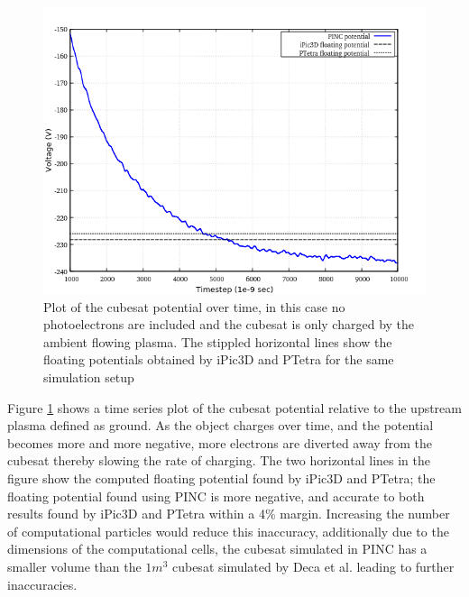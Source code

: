 \begin{figure}[H]
    \centering
    \includegraphics[scale=0.4]{figures/DECA/NoPhotoelectrons/pNoPH.png}
    \caption{Plot of the cubesat potential over time, in this case no photoelectrons are included and the cubesat is only charged by the ambient flowing plasma. The stippled horizontal lines show the floating potentials obtained by iPic3D and PTetra for the same simulation setup}
    \label{fig:pNoPH}
\end{figure}
\raggedbottom
Figure \ref{fig:pNoPH} shows a time series plot of the cubesat potential relative to the upstream plasma defined as ground. As the object charges over time, and the potential becomes more and more negative, more electrons are diverted away from the cubesat thereby slowing the rate of charging. The two horizontal lines in the figure show the computed floating potential found by iPic3D and PTetra; the floating potential found using PINC is more negative, and accurate to both results found by iPic3D and PTetra within a 4\% margin. Increasing the number of computational particles would reduce this inaccuracy, additionally due to the dimensions of the computational cells, the cubesat simulated in PINC has a smaller volume than the $1 m^3$ cubesat simulated by Deca et al. leading to further inaccuracies. 


